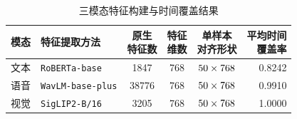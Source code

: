 \begin{table}[!htbp]
\centering{}
\caption{三模态特征构建与时间覆盖结果}
\label{tab:q1_feature_scheme}
\begin{tabularx}{\textwidth}{@{}lXcccr@{}}
\toprule
模态 & 特征提取方法 & \shortstack{原生\\特征数} & \shortstack{特征\\维数} & \shortstack{单样本\\对齐形状} & \shortstack{平均时间\\覆盖率} \\
\midrule
文本 & \texttt{RoBERTa-base} & 1847 & 768 & $50\times768$ & 0.8242 \\
语音 & \texttt{WavLM-base-plus} & 38776 & 768 & $50\times768$ & 0.9910 \\
视觉 & \texttt{SigLIP2-B/16} & 3205 & 768 & $50\times768$ & 1.0000 \\
\bottomrule
\end{tabularx}
\end{table}
